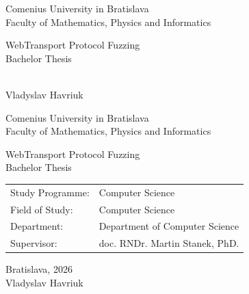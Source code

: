\documentclass[12pt, twoside, openany]{book}
\def\mfrok{2026}
\def\mfnazov{WebTransport Protocol Fuzzing}
\def\mftyp{Bachelor Thesis}
\def\mfautor{Vladyslav Havriuk}
\def\mfskolitel{doc. RNDr. Martin Stanek, PhD.}
\def\mfmiesto{Bratislava, \mfrok}
\def\mfodbor{Computer Science}
\def\program{Computer Science}
\def\mfpracovisko{ Department of Computer Science }
\begin{document}
     
\frontmatter
\pagestyle{empty}


\begin{center}
\sc\large
Comenius University in Bratislava\\
Faculty of Mathematics, Physics and Informatics

\vfill

{\LARGE\mfnazov}\\
\mftyp
\end{center}

\vfill

{\sc\large 
\noindent \mfrok\\
\mfautor
}

\cleardoublepage


\noindent

\begin{center}
\sc  
\large
Comenius University in Bratislava\\
Faculty of Mathematics, Physics and Informatics

\vfill

{\LARGE\mfnazov}\\
\mftyp
\end{center}

\vfill

\noindent
\begin{tabular}{ll}
Study Programme: & \program \\
Field of Study: & \mfodbor \\
Department: & \mfpracovisko \\
Supervisor: & \mfskolitel \\
\end{tabular}

\vfill


\noindent \mfmiesto\\
\mfautor

\cleardoublepage



\newpage
\setcounter{page}{3}


\end{document}
